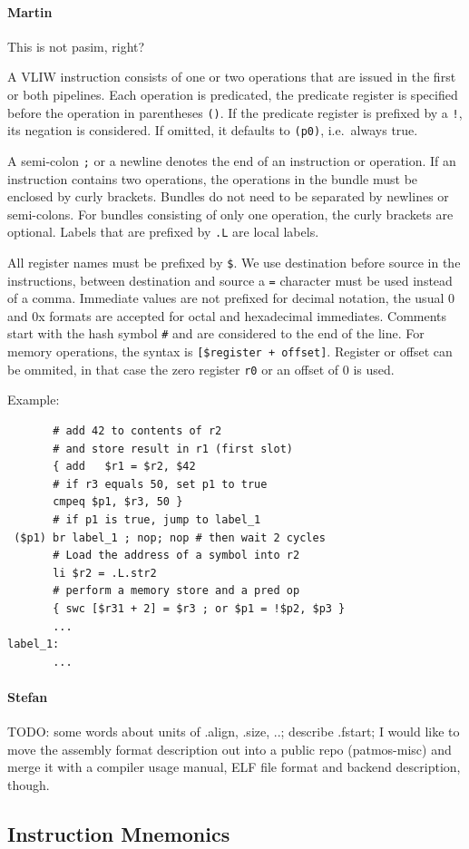 \documentclass{IEEEtran}
\newcommand{\comment}[3]{\paragraph*{\textbf{#1}}{\color{#3}#2}}
\newcommand{\martin}[1]{\comment{Martin}{#1}{Blue}}
\newcommand{\stefan}[1]{\comment{Stefan}{#1}{RoyalPurple}}
\begin{document}
\martin{This is not pasim, right?}

A VLIW instruction consists of one or two operations that are issued in the first or both pipelines.
Each operation is predicated, the predicate register is specified before the operation in parentheses \texttt{()}.
If the predicate register is prefixed by a \texttt{!}, its negation is considered.
If omitted, it defaults to \texttt{(p0)}, i.e.\ always true.

A semi-colon \texttt{;} or a newline denotes the end of an instruction or operation. If an instruction contains two operations, the operations
in the bundle must be enclosed by curly brackets. Bundles do not need to be separated by newlines or semi-colons. For bundles consisting of
only one operation, the curly brackets are optional. Labels that are prefixed by \texttt{.L} are local labels.

All register names must be prefixed by \texttt{\$}. 
We use destination before source in the instructions, between destination and source a \texttt{=} character must be used instead of a comma.
Immediate values are not prefixed for decimal notation, the usual 0 and 0x formats are accepted for octal and hexadecimal immediates.
Comments start with the hash symbol \texttt{\#} and are considered to the end of the line. For memory operations, the syntax is
\texttt{[\$register + offset]}. Register or offset can be ommited, in that case the zero register \texttt{r0} or an offset of $0$ is used.

Example:
\begin{verbatim}
       # add 42 to contents of r2
       # and store result in r1 (first slot)
       { add   $r1 = $r2, $42
       # if r3 equals 50, set p1 to true
       cmpeq $p1, $r3, 50 }
       # if p1 is true, jump to label_1
 ($p1) br label_1 ; nop; nop # then wait 2 cycles
       # Load the address of a symbol into r2
       li $r2 = .L.str2 
       # perform a memory store and a pred op
       { swc [$r31 + 2] = $r3 ; or $p1 = !$p2, $p3 }
       ...
label_1:
       ...
\end{verbatim}

\stefan{TODO: some words about units of .align, .size, ..; describe .fstart; 
I would like to move the assembly format description out into a public repo (patmos-misc) and merge 
it with a compiler usage manual, ELF file format and backend description, though.}

\subsection{Instruction Mnemonics}
\end{document}
